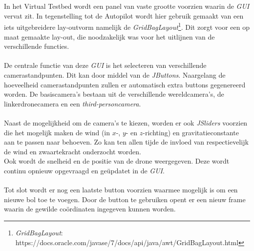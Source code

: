 \\
\\
In het Virtual Testbed wordt een panel van vaste grootte voorzien waarin de \textit{GUI} vervat zit. In tegenstelling tot de Autopilot wordt hier gebruik gemaakt van een iets uitgebreidere lay-outvorm namelijk de \textit{GridBagLayout}\footnote{\textit{GridBagLayout}: https://docs.oracle.com/javase/7/docs/api/java/awt/GridBagLayout.html}. Dit zorgt voor een op maat gemaakte lay-out, die noodzakelijk was voor het uitlijnen van de verschillende functies. 
\\
\\
De centrale functie van deze \textit{GUI} is het selecteren van verschillende camerastandpunten. Dit kan door middel van de \textit{JButtons}. Naargelang de hoeveelheid camerastandpunten zullen er automatisch extra buttons gegenereerd worden. De basiscamera's bestaan uit de verschillende wereldcamera's, de linkerdronecamera en een \textit{third-personcamera}.
\\
\\
Naast de mogelijkheid om de camera's te kiezen, worden er ook \textit{JSliders} voorzien die het mogelijk maken de wind (in \(x\)-, \(y\)- en \(z\)-richting) en gravitatieconstante aan te passen naar behoeven. Zo kan ten allen tijde de invloed van respectievelijk de wind en zwaartekracht onderzocht worden. 
\\
Ook wordt de snelheid en de positie van de drone weergegeven. Deze wordt continu opnieuw opgevraagd en ge\"{u}pdatet in de \textit{GUI}. 
\\
\\
Tot slot wordt er nog een laatste button voorzien waarmee mogelijk is om een nieuwe bol toe te voegen. Door de button te gebruiken opent er een nieuw frame waarin de gewilde co\"ordinaten ingegeven kunnen worden. 